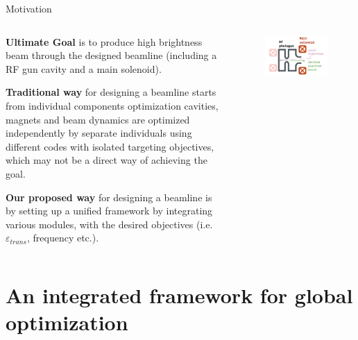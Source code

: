\documentclass[aspectratio=169]{beamer}
\begin{document}
\begin{frame}{Motivation}
\begin{columns}
\begin{column}{0.6\textwidth}
\textbf{Ultimate Goal} is to produce high brightness beam through the designed beamline (including a RF gun cavity and a main solenoid). 

\textbf{Traditional way} for designing a beamline starts from individual components optimization cavities, magnets and beam dynamics are optimized independently by separate individuals using different codes with isolated targeting objectives, which may not be a direct way of achieving the goal. 

\textbf{Our proposed way} for designing a beamline is by setting up a unified framework by integrating various modules, with the desired objectives (i.e. $\varepsilon_{trans}$, frequency etc.). 
\end{column}
\begin{column}{0.35\textwidth}
\begin{figure}
    \centering
        \includegraphics[height=0.7\textwidth]{setup5.png}
    \end{figure}
\end{column}
\end{columns}

\end{frame}

\section{An integrated framework for global optimization}
\end{document}
